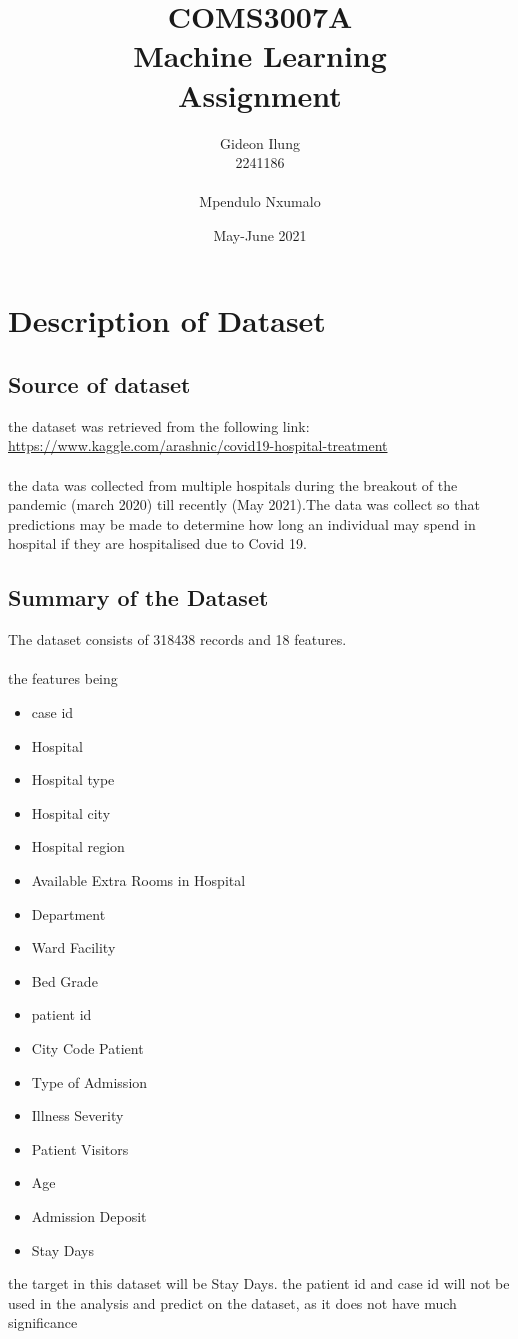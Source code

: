 \documentclass[fleqn]{article}
\title{COMS3007A\\Machine Learning\\Assignment}
\author{Gideon Ilung \\ 2241186 \\ \\ Mpendulo Nxumalo}
\date{May-June 2021}
\begin{document}
	\maketitle
	\newpage
	
	\section*{Description of Dataset}
	
		\subsection*{Source of dataset}
			
			the dataset was retrieved from the following link: \\
			\url{https://www.kaggle.com/arashnic/covid19-hospital-treatment}\\
			\\the data was collected from multiple hospitals during the breakout of 				the pandemic (march 2020) till recently (May 2021).The data was collect 				so that predictions may be made to determine how long an individual may 				spend in hospital if they are hospitalised due to Covid 19.\\
			
		\subsection*{Summary of the Dataset}
			 The dataset consists of 318438 records and 18 features. \\
			 \\ the features being \\
			 \begin{itemize}
			 	\item case id 
			 	\item Hospital
			 	\item Hospital type
			 	\item Hospital city
			 	\item Hospital region
			 	\item Available Extra Rooms in Hospital
			 	\item Department
			 	\item Ward Facility
			 	\item Bed Grade
			 	\item patient id
			 	\item City Code Patient
			 	\item Type of Admission
			 	\item Illness Severity
			 	\item Patient Visitors
			 	\item Age
			 	\item Admission Deposit
			 	\item Stay Days
			 \end{itemize} 		 
			the target in this dataset will be Stay Days. the patient id and case id 			will not be used in the analysis and predict on the dataset, as it does 				not have much significance 
			
\end{document}
